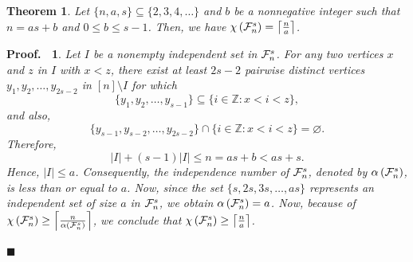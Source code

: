 \documentclass[11pt]{article}
\newtheorem{preproof}{{\bf Proof.\ }}
\newenvironment{proof}[1]{\begin{preproof}{\rm
               #1}\hfill{$\blacksquare$}}{\end{preproof}}
\newtheorem{prethm}{{\bf Theorem}}
\newenvironment{thm}{\begin{prethm}{\hspace{-0.5
               em}{\bf.\ }}}{\end{prethm}}
\begin{document}
\begin{thm} \label{ChromaticNumber}
	Let $\{n,a,s\} \subseteq \{2,3,4, \dots\}$ and $b$ be a nonnegative integer such that
	$n=as+b$ and $0 \leq b \leq s-1$. Then, we have
	$\chi \left(  {\cal F}_{n}^{s}  \right) = \left\lceil   \frac{n}{a}   \right\rceil$. 
\end{thm}

\begin{proof}{
		Let $I$ be a nonempty independent set in $ {\cal F}_{n}^{s} $.
		For any two vertices $x$ and $z$ in $I$ with $x < z$, there exist at least $2s-2$ pairwise distinct
		vertices $y_{1} , y_{2} , \dots , y_{2s-2}$ in $[n] \setminus I$ for which
		$$\{y_{1} , y_{2} , \dots , y_{s-1}\}  \subseteq \{i \in {\mathbb{Z}} : x < i < z\},$$
		and also,
		$$\{y_{s-1} , y_{s-2} , \dots , y_{2s-2}\} \cap \{i \in {\mathbb{Z}} : x < i < z\} = \varnothing .$$
		Therefore,
		$$|I| + (s-1) |I| \leq n=as+b < as+s.$$
		Hence, $|I| \leq a$. Consequently, the independence number of $ {\cal F}_{n}^{s} $,
		denoted by $\alpha \left(  {\cal F}_{n}^{s}  \right)$, is less than or equal to $a$.
		Now, since the set $\{s, 2s, 3s, \dots , as\}$ represents an independent
		set of size $a$ in $ {\cal F}_{n}^{s} $, we obtain $\alpha \left(  {\cal F}_{n}^{s}  \right) = a$.
		Now, because of
		$\chi \left(  {\cal F}_{n}^{s}  \right)  \geq \left\lceil  \frac{n}{\alpha \left(  {\cal F}_{n}^{s}  \right)} \right\rceil$,
		we conclude that
		$\chi \left(  {\cal F}_{n}^{s}  \right) \geq \left\lceil   \frac{n}{a}   \right\rceil$.
		
}
\end{proof}
\end{document}
